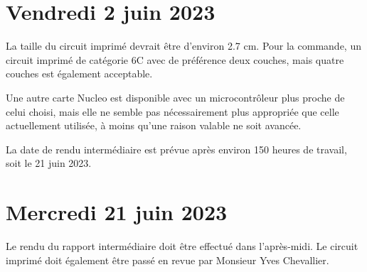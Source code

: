 \section{Vendredi 2 juin 2023}

La taille du circuit imprimé devrait être d'environ 2.7 cm. Pour la commande, un circuit imprimé de catégorie 6C avec de préférence deux couches, mais quatre couches est également acceptable.

Une autre carte Nucleo est disponible avec un microcontrôleur plus proche de celui choisi, mais elle ne semble pas nécessairement plus appropriée que celle actuellement utilisée, à moins qu'une raison valable ne soit avancée.

La date de rendu intermédiaire est prévue après environ 150 heures de travail, soit le 21 juin 2023.

\section{Mercredi 21 juin 2023}

Le rendu du rapport intermédiaire doit être effectué dans l'après-midi.
Le circuit imprimé doit également être passé en revue par Monsieur Yves Chevallier.
